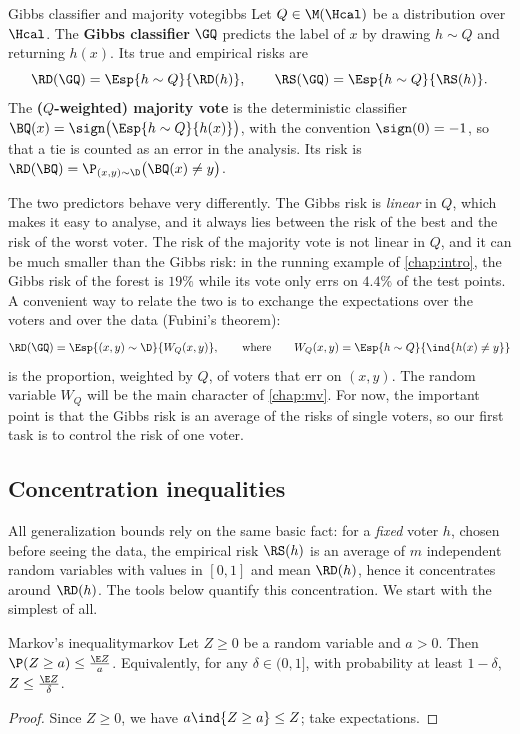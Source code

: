 \begin{definition}{Gibbs classifier and majority vote}{gibbs}
Let $Q\in\M(\Hcal)$ be a distribution over $\Hcal$.
The \textbf{Gibbs classifier} $\GQ$ predicts the label of $x$ by drawing
$h\sim Q$ and returning $h(x)$. Its true and empirical risks are
\[
  \RD(\GQ)=\Esp{h\sim Q}{\RD(h)},\qquad \RS(\GQ)=\Esp{h\sim Q}{\RS(h)}.
\]
The \textbf{($Q$-weighted) majority vote} is the deterministic classifier
$\BQ(x)=\sign\big(\Esp{h\sim Q}{h(x)}\big)$, with the convention
$\sign(0)=-1$, so that a tie is counted as an error in the analysis. Its risk is
$\RD(\BQ)=\P_{(x,y)\sim\D}\big(\BQ(x)\neq y\big)$.
\end{definition}

The two predictors behave very differently. The Gibbs risk is \emph{linear} in
$Q$, which makes it easy to analyse, and it always lies between the risk of the
best and the risk of the worst voter. The risk of the majority vote is not
linear in $Q$, and it can be much smaller than the Gibbs risk: in the running
example of \cref{chap:intro}, the Gibbs risk of the forest is $19\%$ while its
vote only errs on $4.4\%$ of the test points. A convenient way to relate the two
is to exchange the expectations over the voters and over the data (Fubini's theorem):
\[
\RD(\GQ)=\Esp{(x,y)\sim\D}{W_Q(x,y)},\qquad\text{where}\qquad
W_Q(x,y)=\Esp{h\sim Q}{\ind{h(x)\neq y}}
\]
is the proportion, weighted by $Q$, of voters that err on $(x,y)$. The random
variable $W_Q$ will be the main character of \cref{chap:mv}. For now, the
important point is that the Gibbs risk is an average of the risks of single
voters, so our first task is to control the risk of one voter.

\subsection{Concentration inequalities}

All generalization bounds rely on the same basic fact: for a \emph{fixed}
voter $h$, chosen before seeing the data, the empirical risk $\RS(h)$ is an
average of $m$ independent random variables with values in $[0,1]$ and mean
$\RD(h)$, hence it concentrates around $\RD(h)$. The tools below quantify this
concentration. We start with the simplest of all.

\begin{lemma}{Markov's inequality}{markov}
Let $Z\geq 0$ be a random variable and $a>0$. Then $\P(Z\geq a)\leq \frac{\E Z}{a}$.
Equivalently, for any $\delta\in(0,1]$, with probability at least $1-\delta$, $Z\leq\frac{\E Z}{\delta}$.
\end{lemma}
\begin{proof}
Since $Z\geq0$, we have $a\ind{Z\geq a}\leq Z$; take expectations.
\end{proof}

